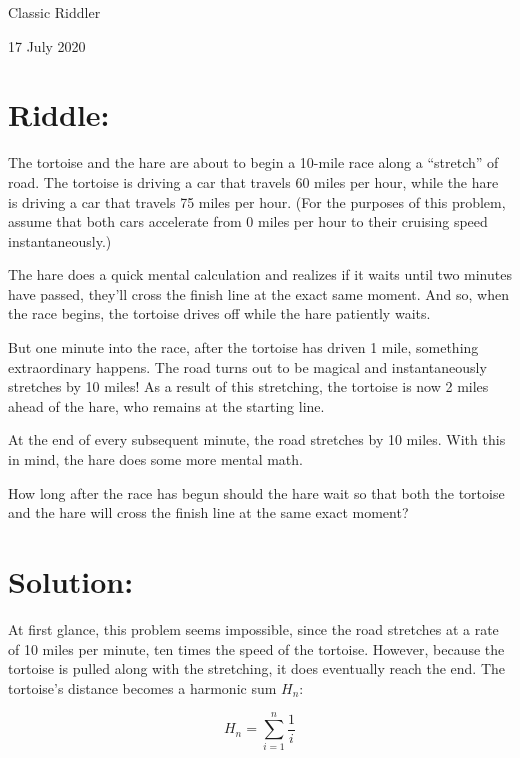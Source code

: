 \documentclass{article}
\begin{document}
\pagestyle{empty} %

\begin{center}
{\LARGE Classic Riddler}

\vspace{0.15in}

{\Large 17 July 2020}
\end{center}


\section*{Riddle:}

The tortoise and the hare are about to begin a 10-mile race along a ``stretch'' of road.
The tortoise is driving a car that travels 60 miles per hour, while the hare is driving a car that travels 75 miles per hour.
(For the purposes of this problem, assume that both cars accelerate from 0 miles per hour to their cruising speed instantaneously.)

The hare does a quick mental calculation and realizes if it waits until two minutes have passed, they’ll cross the finish line at the exact same moment.
And so, when the race begins, the tortoise drives off while the hare patiently waits.

But one minute into the race, after the tortoise has driven 1 mile, something extraordinary happens.
The road turns out to be magical and instantaneously stretches by 10 miles!
As a result of this stretching, the tortoise is now 2 miles ahead of the hare, who remains at the starting line.

At the end of every subsequent minute, the road stretches by 10 miles.
With this in mind, the hare does some more mental math.

How long after the race has begun should the hare wait so that both the tortoise and the hare will cross the finish line at the same exact moment?

\section*{Solution:}

At first glance, this problem seems impossible, since the road stretches at a rate of 10 miles per minute, ten times the speed of the tortoise.
However, because the tortoise is pulled along with the stretching, it does eventually reach the end.
The tortoise's distance becomes a harmonic sum $H_{n}$:

\[
H_{n}=\sum_{i=1}^{n} \frac{1}{i}
\]
\end{document}
